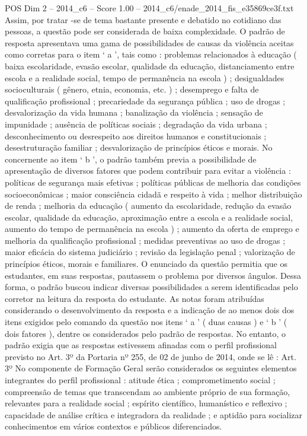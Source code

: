\begin{textsample}{POS Dim 2 – 2014\_c6 – Score 1.00 – 2014\_c6/enade\_2014\_fis\_e35869ce3f.txt}
Assim, por tratar -se de tema bastante presente e debatido no cotidiano das pessoas, a questão pode ser considerada de baixa complexidade.
O padrão de resposta apresentava uma gama de possibilidades de causas da violência aceitas como corretas para o item ‘ a ’, tais como : problemas relacionados à educação ( baixa escolaridade, evasão escolar, qualidade da educação, distanciamento entre escola e a realidade social, tempo de permanência na escola ) ; desigualdades socioculturais ( gênero, etnia, economia, etc. ) ; desemprego e falta de qualificação profissional ; precariedade da segurança pública ; uso de drogas ; desvalorização da vida humana ; banalização da violência ; sensação de impunidade ; ausência de políticas sociais ; degradação da vida urbana ; desconhecimento ou desrespeito aos direitos humanos e constitucionais ; desestruturação familiar ; desvalorização de princípios éticos e morais.
No concernente ao item ‘ b ’, o padrão também previa a possibilidade de apresentação de diversos fatores que podem contribuir para evitar a violência : políticas de segurança mais efetivas ; políticas públicas de melhoria das condições socioeconômicas ; maior consciência cidadã e respeito à vida ; melhor distribuição de renda ; melhoria da educação ( aumento da escolaridade, redução da evasão escolar, qualidade da educação, aproximação entre a escola e a realidade social, aumento do tempo de permanência na escola ) ; aumento da oferta de emprego e melhoria da qualificação profissional ; medidas preventivas ao uso de drogas ; maior eficácia do sistema judiciário ; revisão da legislação penal ; valorização de princípios éticos, morais e familiares.
O enunciado da questão permitia que os estudantes, em suas respostas, pautassem o problema por diversos ângulos.
Dessa forma, o padrão buscou indicar diversas possibilidades a serem identificadas pelo corretor na leitura da resposta do estudante.
As notas foram atribuídas considerando o desenvolvimento da resposta e a indicação de ao menos dois dos itens exigidos pelo comando da questão nos itens ‘ a ’ ( duas causas ) e ‘ b ’ ( dois fatores ), dentre os considerados pelo padrão de respostas.
No entanto, o padrão exigia que as respostas estivessem afinadas com o perfil profissional previsto no Art. 3º da Portaria nº 255, de 02 de junho de 2014, onde se lê : Art. 3º No componente de Formação Geral serão considerados os seguintes elementos integrantes do perfil profissional : atitude ética ; comprometimento social ; compreensão de temas que transcendam ao ambiente próprio de sua formação, relevantes para a realidade social ; espírito científico, humanístico e reflexivo ; capacidade de análise crítica e integradora da realidade ; e aptidão para socializar conhecimentos em vários contextos e públicos diferenciados.

\end{textsample}
